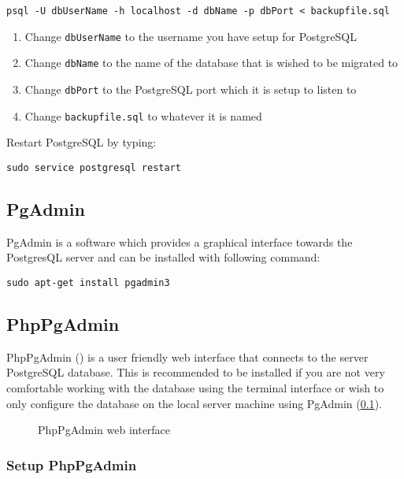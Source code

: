 \begin{verbatim}
psql -U dbUserName -h localhost -d dbName -p dbPort < backupfile.sql
\end{verbatim}
\begin{enumerate}
\item Change \verb+dbUserName+ to the username you have setup for PostgreSQL
\item Change \verb+dbName+ to the name of the database that is wished to be migrated to
\item Change \verb+dbPort+ to the PostgreSQL port which it is setup to listen to
\item Change \verb+backupfile.sql+ to whatever it is named
\end{enumerate}
Restart PostgreSQL by typing:
\begin{verbatim}
sudo service postgresql restart
\end{verbatim}




\subsection{PgAdmin}\label{sec:exp_d_pgadmin}
PgAdmin is a software which provides a graphical interface towards the PostgresQL server and can be installed with following command:
\begin{verbatim}
sudo apt-get install pgadmin3
\end{verbatim}





\subsection{PhpPgAdmin}
PhpPgAdmin () is a user friendly web interface that connects to the server PostgreSQL database. 
This is recommended to be installed if you are not very comfortable working with the database using the terminal 
interface or wish to only configure the database on the local server machine using PgAdmin (\ref{sec:exp_d_pgadmin}). 


\begin{figure}[htb]
\centering
{}
\caption{PhpPgAdmin web interface}
\label{fig:exp_d_phppgadminpic}
\end{figure}

\subsubsection{Setup PhpPgAdmin}

